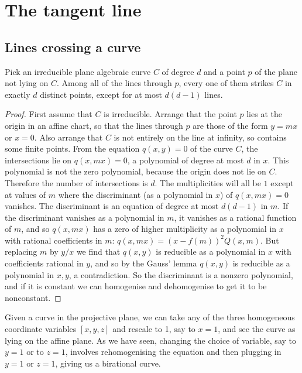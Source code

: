 \chapter{The tangent line}\label{chapter:tangent.line}

\section{Lines crossing a curve}
\begin{proposition}\label{proposition:lines.crossing}
Pick an irreducible plane algebraic curve \(C\) of degree \(d\) and a point \(p\) of the plane not lying on \(C\).
Among all of the lines through \(p\), every one of them strikes \(C\) in exactly \(d\) distinct points, except for at most \(d(d-1)\) lines.
\end{proposition}
\begin{proof}
First assume that \(C\) is irreducible.
Arrange that the point \(p\) lies at the origin in an affine chart, so that the lines through \(p\) are those of the form \(y=mx\) or \(x=0\).
Also arrange that \(C\) is not entirely on the line at infinity, so contains some finite points.
From the equation \(q(x,y)=0\) of the curve \(C\), the intersections lie on \(q(x,mx)=0\), a polynomial of degree at most \(d\) in \(x\).
This polynomial is not the zero polynomial, because the origin does not lie on \(C\).
Therefore the number of intersections is \(d\).
The multiplicities will all be \(1\) except at values of \(m\) where the discriminant (as a polynomial in \(x\)) of \(q(x,mx)=0\) vanishes.
The discriminant is an equation of degree at most \(d(d-1)\) in \(m\).
If the discriminant vanishes as a polynomial in \(m\), it vanishes as a rational function of \(m\), and so \(q(x,mx)\) has a zero of higher multiplicity as a polynomial in \(x\) with rational coefficients in \(m\): \(q(x,mx)=(x-f(m))^2 Q(x,m)\).
But replacing \(m\) by \(y/x\) we find that \(q(x,y)\) is reducible as a polynomial in \(x\) with coefficients rational in \(y\), and so by the Gauss' lemma \(q(x,y)\) is reducible as a polynomial in \(x,y\), a contradiction.
So the discriminant is a nonzero polynomial, and if it is constant we can homogenise and dehomogenise to get it to be nonconstant.
\end{proof}

Given a curve in the projective plane, we can take any of the three homogeneous coordinate variables \([x,y,z]\) and rescale to 1, say to \(x=1\), and see the curve as lying on the affine plane.
As we have seen, changing the choice of variable, say to \(y=1\) or to \(z=1\), involves rehomogenising the equation and then plugging in \(y=1\) or \(z=1\), giving us a birational curve.

